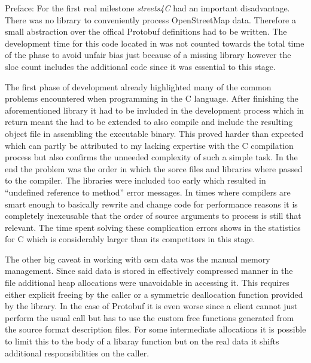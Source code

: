 Preface: For the first real milestone \textit{streets4C} had an important disadvantage. There was no library to conveniently process OpenStreetMap data. Therefore a small abstraction over the offical Protobuf definitions had to be written. The development time for this code located in  was not counted towards the total time of the phase to avoid unfair bias just because of a missing library however the \gls{sloc} count includes the additional code since it was essential to this stage.

The first phase of development already highlighted many of the common problems encountered when programming in the C language. After finishing the aforementioned library it had to be invluded in the development process which in return meant the  had to be extended to also compile  and include the resulting object file in assembling the executable binary. This proved harder than expected which can partly be attributed to my lacking expertise with the C compilation process but also confirms the unneeded complexity of such a simple task. In the end the problem was the order in which the sorce files and libraries where passed to the compiler. The libraries were included too early which resulted in ``undefined reference to method'' error messages. In times where compilers are smart enough to basically rewrite and change code for performance reasons it is completely inexcusable that the order of source arguments to process is still that relevant. The time spent solving these complication errors shows in the statistics for C which is considerably larger than its competitors in this stage.

The other big caveat in working with \gls{osm} data was the manual memory management. Since said data is stored in effectively compressed manner in the file additional heap allocations were unavoidable in accessing it. This requires either explicit freeing by the caller or a symmetric deallocation function provided by the library. In the case of Protobuf it is even worse since a client cannot just perform the usual  call but has to use the custom free functions generated from the source  format description files. For some intermediate allocations it is possible to limit this to the body of a libaray function but on the real data it shifts additional responsibilities on the caller.
\\


